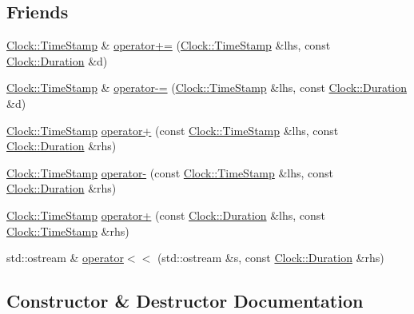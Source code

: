 \subsection*{Friends}
\begin{DoxyCompactItemize}
\item 
\hyperlink{class_clock_1_1_time_stamp}{Clock\+::\+Time\+Stamp} \& \hyperlink{class_clock_1_1_duration_a4ba2a6872ed75f179345c471182c67dc}{operator+=} (\hyperlink{class_clock_1_1_time_stamp}{Clock\+::\+Time\+Stamp} \&lhs, const \hyperlink{class_clock_1_1_duration}{Clock\+::\+Duration} \&d)
\item 
\hyperlink{class_clock_1_1_time_stamp}{Clock\+::\+Time\+Stamp} \& \hyperlink{class_clock_1_1_duration_ae528b7884dfc30e2a28f00c07aa20d24}{operator-\/=} (\hyperlink{class_clock_1_1_time_stamp}{Clock\+::\+Time\+Stamp} \&lhs, const \hyperlink{class_clock_1_1_duration}{Clock\+::\+Duration} \&d)
\item 
\hyperlink{class_clock_1_1_time_stamp}{Clock\+::\+Time\+Stamp} \hyperlink{class_clock_1_1_duration_a0c03a6eab08831e78e238ba6498c40a7}{operator+} (const \hyperlink{class_clock_1_1_time_stamp}{Clock\+::\+Time\+Stamp} \&lhs, const \hyperlink{class_clock_1_1_duration}{Clock\+::\+Duration} \&rhs)
\item 
\hyperlink{class_clock_1_1_time_stamp}{Clock\+::\+Time\+Stamp} \hyperlink{class_clock_1_1_duration_ac693b02ffb2e0b8b9c402642f7f0169f}{operator-\/} (const \hyperlink{class_clock_1_1_time_stamp}{Clock\+::\+Time\+Stamp} \&lhs, const \hyperlink{class_clock_1_1_duration}{Clock\+::\+Duration} \&rhs)
\item 
\hyperlink{class_clock_1_1_time_stamp}{Clock\+::\+Time\+Stamp} \hyperlink{class_clock_1_1_duration_a829ab58b50ec9125fe832b4dfad2cea4}{operator+} (const \hyperlink{class_clock_1_1_duration}{Clock\+::\+Duration} \&lhs, const \hyperlink{class_clock_1_1_time_stamp}{Clock\+::\+Time\+Stamp} \&rhs)
\item 
std\+::ostream \& \hyperlink{class_clock_1_1_duration_ac26e3a3eb0bc2e0f2e49dbb86e484dad}{operator$<$$<$} (std\+::ostream \&s, const \hyperlink{class_clock_1_1_duration}{Clock\+::\+Duration} \&rhs)
\end{DoxyCompactItemize}


\subsection{Constructor \& Destructor Documentation}
